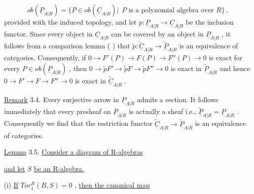 \begin{equation*}
ob(\underline{P}_{A|R}) = \{P \in ob(\underline{C}_{A|R})|\ \ P \text{ is a polynomial algebra over } R\} \ ,
\end{equation*}
provided with the induced topology, and let  $p : \underline{P}_{A|R} \to \underline{C}_{A|R}$  be the inclusion functor. Since every object in  $\underline{C}_{A|R}$  can be covered by an object in  $\underline{P}_{A|R}$ , it follows from a comparison lemma (          ) that  $\widetilde{p} : \widetilde{\underline{C}}_{A|R} \to \widetilde{\underline{P}}_{A|R}$  is an equivalence of categories. Consequently, if  $0 \to F'(P) \to F(P) \to F''(P) \to 0$  is exact for every  $P \in ob(\underline{P}_{A|R})$ , then  $0 \to \widetilde{p}F' \to \widetilde{p}F \to \widetilde{p}F'' \to 0$  is exact in  $\widetilde{\underline{P}}_{A|R}$  and hence  $0 \to F' \to F \to F'' \to 0$  is exact in  $\widetilde{\underline{C}}_{A|R}$  .



\underline{Remark} 3.4.  Every surjective arrow in  $\underline{P}_{A|R}$  admits a section. It follows immediately that every presheaf on  $\underline{P}_{A|R}$  is actually a sheaf i.e.,  $\widetilde{\underline{P}}_{A|R} = \underline{P}_{A|R}$ . Consequently we find that the restriction functor  $\widetilde{\underline{C}}_{A|R} \to \check{\underline{P}}_{A|R}$  is an equivalence of categories.

\underline{Lemma} 3.5.  \underline{Consider a diagram of R-algebras}

\begin{center}
\end{center}
\underline{and let}  $S$  \underline{be an R-algebra.}

(i)  \underline{If}  $Tor^{R}_{1}(B,S) = 0$  , \underline{then the canonical map}


